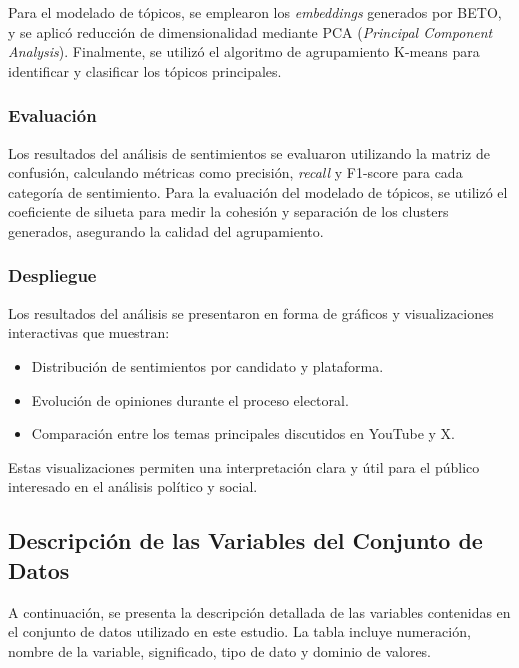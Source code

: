\documentclass[10pt, a4paper]{article}
\begin{document}
	Para el modelado de tópicos, se emplearon los \textit{embeddings} generados por BETO, y se aplicó reducción de dimensionalidad mediante PCA (\textit{Principal Component Analysis}). Finalmente, se utilizó el algoritmo de agrupamiento K-means para identificar y clasificar los tópicos principales.
	
	\subsubsection{Evaluación}
	Los resultados del análisis de sentimientos se evaluaron utilizando la matriz de confusión, calculando métricas como precisión, \textit{recall} y F1-score para cada categoría de sentimiento. Para la evaluación del modelado de tópicos, se utilizó el coeficiente de silueta para medir la cohesión y separación de los clusters generados, asegurando la calidad del agrupamiento.
	
	\subsubsection{Despliegue}
	Los resultados del análisis se presentaron en forma de gráficos y visualizaciones interactivas que muestran:
	\begin{itemize}
		\item Distribución de sentimientos por candidato y plataforma.
		\item Evolución de opiniones durante el proceso electoral.
		\item Comparación entre los temas principales discutidos en YouTube y X.
	\end{itemize}
	Estas visualizaciones permiten una interpretación clara y útil para el público interesado en el análisis político y social.
	
	
	\subsection{Descripción de las Variables del Conjunto de Datos}
	
	A continuación, se presenta la descripción detallada de las variables contenidas en el conjunto de datos utilizado en este estudio. La tabla incluye numeración, nombre de la variable, significado, tipo de dato y dominio de valores.
	
\end{document}
